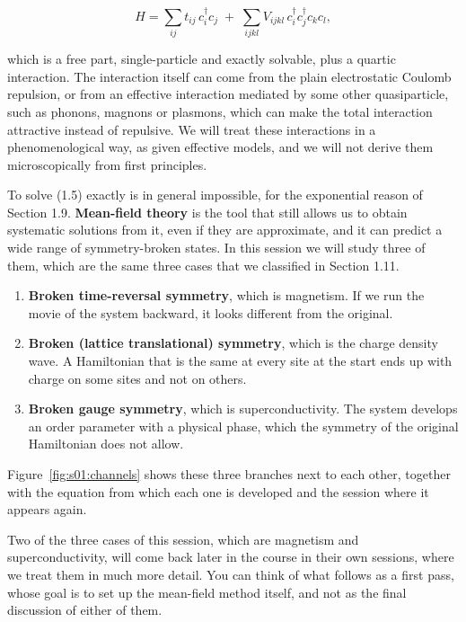 \begin{equation}
H = \sum_{ij} t_{ij}\, c_i^\dagger c_j \;+\; \sum_{ijkl} V_{ijkl}\, c_i^\dagger c_j^\dagger c_k c_l,
\end{equation}

which is a free part, single-particle and exactly solvable, plus a quartic interaction. The
interaction itself can come from the plain electrostatic Coulomb repulsion, or from an effective
interaction mediated by some other quasiparticle, such as phonons, magnons or plasmons, which can
make the total interaction attractive instead of repulsive. We will treat these interactions in a
phenomenological way, as given effective models, and we will not derive them microscopically from
first principles.

To solve (1.5) exactly is in general impossible, for the exponential reason of Section 1.9.
\textbf{Mean-field theory} is the tool that still allows us to obtain systematic solutions from it,
even if they are approximate, and it can predict a wide range of symmetry-broken states. In this
session we will study three of them, which are the same three cases that we classified in Section
1.11.

\begin{enumerate}
\item \textbf{Broken time-reversal symmetry}, which is magnetism. If we run the movie of the system
   backward, it looks different from the original.
\item \textbf{Broken (lattice translational) symmetry}, which is the charge density wave. A
   Hamiltonian that is the same at every site at the start ends up with charge on some sites and
   not on others.
\item \textbf{Broken gauge symmetry}, which is superconductivity. The system develops an order
   parameter with a physical phase, which the symmetry of the original Hamiltonian does not allow.
\end{enumerate}

Figure~\ref{fig:s01:channels} shows these three branches next to each other, together with the
equation from which each one is developed and the session where it appears again.



Two of the three cases of this session, which are magnetism and superconductivity, will come back
later in the course in their own sessions, where we treat them in much more detail. You can think of
what follows as a first pass, whose goal is to set up the mean-field method itself, and not as the
final discussion of either of them.

